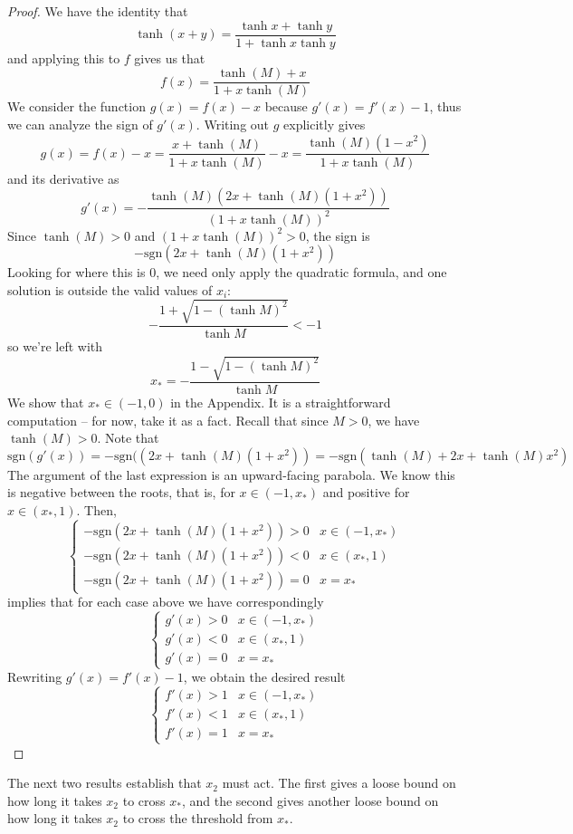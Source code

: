\documentclass[preprint,12pt]{elsarticle}
\begin{document}
\begin{proof} We have the identity that \[\tanh(x + y)  = \frac{\tanh x + \tanh y }{1 + \tanh x\tanh y}\]
and applying this to $f$ gives us that
\[
f(x) = \frac{\tanh(M) + x}{ 1 + x\tanh(M)}
\]
We consider the function $g(x) = f(x) -x$ because $g'(x) = f'(x) - 1$, thus we can analyze the sign of $g'(x)$. Writing out $g$ explicitly gives
\[
g(x) = f(x) - x = \frac{x + \tanh(M)}{ 1+ x\tanh(M)} - x = \frac{\tanh(M)(1 - x^2)}{1 + x\tanh(M)}
\]
and its derivative as
\[
g'(x) = -\frac{\tanh(M)(2x + \tanh(M)(1+x^2))}{(1 + x\tanh(M))^2}
\]
Since $\tanh(M) > 0 $ and $(1+x\tanh(M))^2 > 0$, the sign is \[
-\text{sgn}(2x + \tanh(M)(1+x^2))
\]
Looking for where this is 0, we need only apply the quadratic formula,
and one solution is outside the valid values of $x_i$: \[
-\frac{1  + \sqrt{1 - (\tanh M)^2}}{\tanh M} < -1
\]
so we're left with 
\[
x_* = -\frac{1  - \sqrt{1 - (\tanh M)^2}}{\tanh M}
\]
We show that $x_* \in (-1,0)$ in the Appendix. It is a straightforward computation -- for now, take it as a fact. Recall that since $M> 0$, we have $\tanh(M) > 0$. Note that \[\text{sgn}(g'(x)) = -\text{sgn}((2x + \tanh(M)(1+x^2)) = -\text{sgn}(\tanh(M) + 2x + \tanh(M)x^2)\] The argument of the last expression is an upward-facing parabola. We know this is negative between the roots, that is, for $x \in (-1,x_*)$ and positive for $x \in (x_*,1)$. Then, \[
 \begin{cases}-\text{sgn}(2x + \tanh(M)(1+x^2))  > 0 & x \in (-1, x_*)\\
 -\text{sgn}(2x + \tanh(M)(1+x^2))  < 0  & x \in (x_*, 1) \\
-\text{sgn}(2x + \tanh(M)(1+x^2))  = 0 & x = x_*
\end{cases} \]implies that for each case above we have correspondingly \[ \begin{cases}
  g'(x) > 0 & x \in (-1, x_*)   \\
g'(x)  < 0  & x \in (x_*, 1)\\
g'(x) = 0 & x = x_*
\end{cases}\]
Rewriting $g'(x) = f'(x) - 1$, we obtain the desired result\[
\begin{cases}
  f'(x) > 1 & x \in (-1, x_*)   \\
f'(x)  < 1  & x \in (x_*, 1)\\
f'(x) = 1 & x = x_*
\end{cases}\]
\end{proof}
The next two results establish that $x_2$ must act. The first gives a loose bound on how long it takes $x_2$ to cross $x_*$, and the second gives another loose bound on how long it takes $x_2$ to cross the threshold from $x_*$. 
\end{document}
